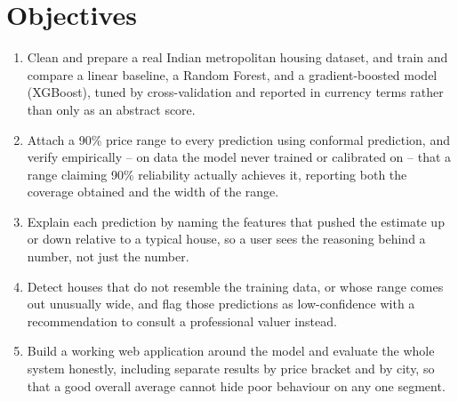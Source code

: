 \documentclass[12pt]{report}
\begin{document}
\section{Objectives}
\label{sec:objectives}
\begin{enumerate}[label=\arabic*.]
\item Clean and prepare a real Indian metropolitan housing dataset, and train and
compare a linear baseline, a Random Forest, and a gradient-boosted model (XGBoost),
tuned by cross-validation and reported in currency terms rather than only as an
abstract score.
\item Attach a 90\% price range to every prediction using conformal prediction, and
verify empirically -- on data the model never trained or calibrated on -- that a
range claiming 90\% reliability actually achieves it, reporting both the coverage
obtained and the width of the range.
\item Explain each prediction by naming the features that pushed the estimate up or
down relative to a typical house, so a user sees the reasoning behind a number, not
just the number.
\item Detect houses that do not resemble the training data, or whose range comes out
unusually wide, and flag those predictions as low-confidence with a recommendation to
consult a professional valuer instead.
\item Build a working web application around the model and evaluate the whole system
honestly, including separate results by price bracket and by city, so that a good
overall average cannot hide poor behaviour on any one segment.
\end{enumerate}
\end{document}
